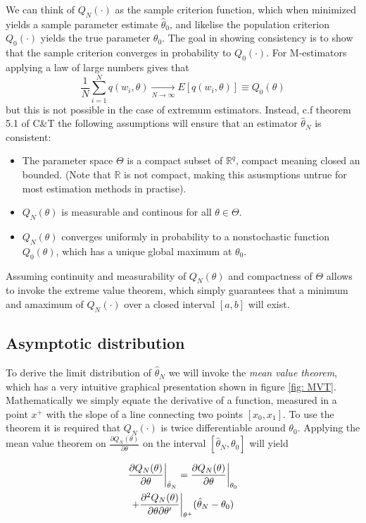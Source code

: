 We can think of $Q_N(\cdot)$ as the sample criterion function, which when minimized yields a sample parameter estimate $\hat{\theta}_0$, and likelise the population criterion $Q_0(\cdot)$ yields the true parameter $\theta_0$. The goal in showing consistency is to show that the sample criterion converges in probability to $Q_0(\cdot)$. For M-estimators applying a law of large numbers gives that
\begin{equation}
\frac{1}{N} \sum_{i=1}^N q(w_i, \theta) \underset{N \rightarrow \infty}{\rightarrow} E[q(w_i, \theta)] \equiv Q_0(\theta)
\end{equation}
but this is not possible in the case of extremum estimators. Instead, c.f theorem 5.1 of C\&T the following assumptions will ensure that an estimator $\hat{\theta}_N$ is consistent:
\begin{itemize}
\item The parameter space $\Theta$ is a compact subset of $\mathbb{R}^q$, compact meaning closed an bounded. (Note that $\mathbb{R}$ is not compact, making this asusmptions untrue for most estimation methods in practise).
\item $Q_N(\theta)$ is measurable and continous for all $\theta \in \Theta$.
\item $Q_N(\theta)$ converges uniformly in probability to a nonstochastic function $Q_0(\theta)$, which has a unique global maximum at $\theta_0$.
\end{itemize}
Assuming continuity and measurability of $Q_N(\theta)$ and compactness of $\Theta$ allows to invoke the extreme value theorem, which simply guarantees that a minimum and amaximum of $Q_N(\cdot)$ over a closed interval $[a,b]$ will exist.

\subsection{Asymptotic distribution}
To derive the limit distribution of $\hat{\theta}_N$ we will invoke the \textit{mean value theorem}, which has a very intuitive graphical presentation shown in figure \ref{fig: MVT}. Mathematically we simply equate the derivative of a function, measured in a point $x^+$ with the slope of a line connecting two points $[x_0,x_1]$. To use the theorem it is required that $Q_N(\cdot)$ is twice differentiable around $\theta_0$. Applying the mean value theorem on $\frac{\partial Q_N(\theta)}{\partial \theta}$ on the interval $[\hat{\theta}_N, \theta_0]$ will yield

\begin{multline}
\frac{\partial Q_N(\theta)}{\partial \theta} \bigg{|}_{\hat{\theta}_N} =
\frac{\partial Q_N(\theta)}{\partial \theta} \bigg{|}_{\theta_0} \\ +
\frac{\partial^2 Q_N(\theta)}{\partial \theta \partial \theta'} \bigg{|}_{\theta^+}(\hat{\theta}_N - \theta_0)
\end{multline}

